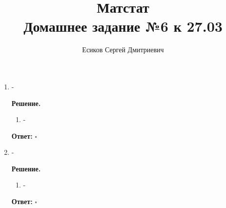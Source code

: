 \documentclass[12pt]{article}
\title{\textbf{Матстат}\\Домашнее задание №6 к 27.03}
\author{Есиков Сергей Дмитриевич}
\newenvironment{solution}{\textbf{Решение.}\par}{\hfill\(\square\)}
\newcommand{\answer}[1]{\textbf{Ответ:} \boxed{#1}}
\begin{document}
\maketitle

\begin{enumerate}[label=\textbf{\arabic*.}, left=0pt]
    \item -
          
    \begin{solution}
              \begin{enumerate}
                  \item -
              \end{enumerate}
              \answer{-}
          \end{solution}
    
    \item -
          
    \begin{solution}
              \begin{enumerate}
                  \item -
              \end{enumerate}
              \answer{-}
          \end{solution}
\end{enumerate}
\end{document}
